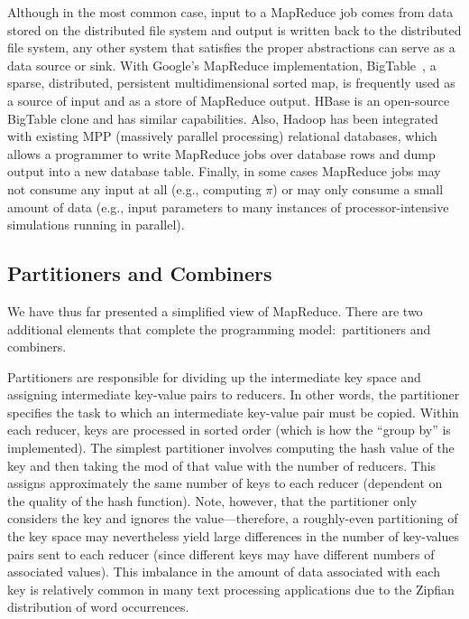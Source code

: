 \documentclass[11pt]{article}
\begin{document}
Although in the most common case, input to a MapReduce job comes from
data stored on the distributed file system and output is written back
to the distributed file system, any other system that satisfies the
proper abstractions can serve as a data source or sink.  With Google's
MapReduce implementation, BigTable~\cite{ChangFay_etal_OSDI2006}, a
sparse, distributed, persistent multidimensional sorted map, is
frequently used as a source of input and as a store of MapReduce
output.  HBase is an open-source BigTable clone and has similar
capabilities.  Also, Hadoop has been integrated with existing MPP
(massively parallel processing) relational databases, which allows a
programmer to write MapReduce jobs over database rows and dump output
into a new database table.  Finally, in some cases MapReduce jobs may
not consume any input at all (e.g., computing $\pi$) or may only
consume a small amount of data (e.g., input parameters to many
instances of processor-intensive simulations running in parallel).

\subsection{Partitioners and Combiners}
\label{chapter2:partitioners-and-combiners}

We have thus far presented a simplified view of MapReduce.  There are
two additional elements that complete the programming model:\
partitioners and combiners.

Partitioners are responsible for dividing up the intermediate key
space and assigning intermediate key-value pairs to reducers.  In
other words, the partitioner specifies the task to which an
intermediate key-value pair must be copied.  Within each reducer, keys
are processed in sorted order (which is how the ``group by'' is
implemented).  The simplest partitioner involves computing the hash
value of the key and then taking the mod of that value with the number
of reducers.  This assigns approximately the same number of keys to
each reducer (dependent on the quality of the hash function).  Note,
however, that the partitioner only considers the key and ignores the
value---therefore, a roughly-even partitioning of the key space may
nevertheless yield large differences in the number of key-values pairs
sent to each reducer (since different keys may have different numbers
of associated values).  This imbalance in the amount of data
associated with each key is relatively common in many text processing
applications due to the Zipfian distribution of word occurrences.
\end{document}
